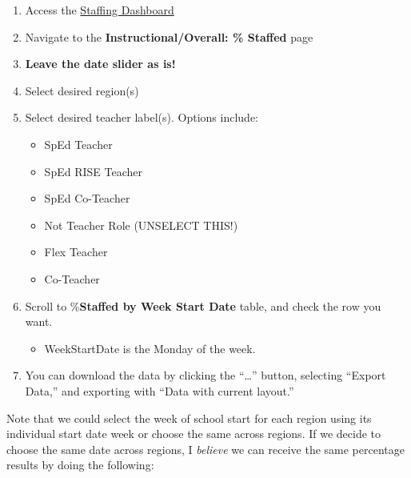 \documentclass[
  letterpaper,
  DIV=11,
  numbers=noendperiod]{scrreprt}
\providecommand{\tightlist}{%
  \setlength{\itemsep}{0pt}\setlength{\parskip}{0pt}}
\begin{document}
\begin{enumerate}
\def\labelenumi{\arabic{enumi}.}
\tightlist
\item
  Access the
  \href{https://app.powerbi.com/groups/me/reports/a5d80984-d4e3-411d-b301-900ac1c790ad/ac6eda202eb561291ee5?experience=power-bi}{Staffing
  Dashboard}
\item
  Navigate to the \textbf{Instructional/Overall: \% Staffed} page
\item
  \textbf{Leave the date slider as is!}
\item
  Select desired region(s)
\item
  Select desired teacher label(s). Options include:

  \begin{itemize}
  \tightlist
  \item
    SpEd Teacher
  \item
    SpEd RISE Teacher
  \item
    SpEd Co-Teacher
  \item
    Not Teacher Role (UNSELECT THIS!)
  \item
    Flex Teacher
  \item
    Co-Teacher
  \end{itemize}
\item
  Scroll to \%\textbf{Staffed by Week Start Date} table, and check the
  row you want.

  \begin{itemize}
  \tightlist
  \item
    WeekStartDate is the Monday of the week.
  \end{itemize}
\item
  You can download the data by clicking the ``\ldots{}'' button,
  selecting ``Export Data,'' and exporting with ``Data with current
  layout.''
\end{enumerate}

Note that we could select the week of school start for each region using
its individual start date week or choose the same across regions. If we
decide to choose the same date across regions, I \emph{believe} we can
receive the same percentage results by doing the following:
\end{document}
